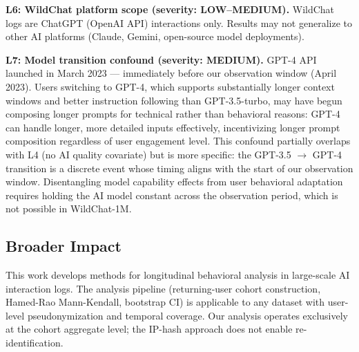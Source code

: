 \textbf{L6: WildChat platform scope (severity: LOW--MEDIUM).} WildChat logs are ChatGPT (OpenAI API) interactions only. Results may not generalize to other AI platforms (Claude, Gemini, open-source model deployments).

\textbf{L7: Model transition confound (severity: MEDIUM).} GPT-4 API launched in March 2023 --- immediately before our observation window (April 2023). Users switching to GPT-4, which supports substantially longer context windows and better instruction following than GPT-3.5-turbo, may have begun composing longer prompts for technical rather than behavioral reasons: GPT-4 can handle longer, more detailed inputs effectively, incentivizing longer prompt composition regardless of user engagement level. This confound partially overlaps with L4 (no AI quality covariate) but is more specific: the GPT-3.5 $\rightarrow$ GPT-4 transition is a discrete event whose timing aligns with the start of our observation window. Disentangling model capability effects from user behavioral adaptation requires holding the AI model constant across the observation period, which is not possible in WildChat-1M.

\subsection{Broader Impact}

This work develops methods for longitudinal behavioral analysis in large-scale AI interaction logs. The analysis pipeline (returning-user cohort construction, Hamed-Rao Mann-Kendall, bootstrap CI) is applicable to any dataset with user-level pseudonymization and temporal coverage. Our analysis operates exclusively at the cohort aggregate level; the IP-hash approach does not enable re-identification.
